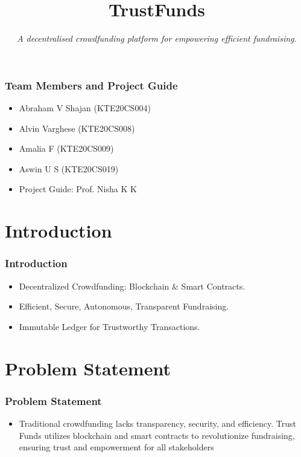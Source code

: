 \documentclass{beamer}
\title[SkillVine]{\textbf{TrustFunds}}
\subtitle{\textit{A decentralised crowdfunding platform for empowering efficient fundraising.}}
\date{}
\begin{document}
{
\begin{frame}[plain]
  \vspace{60pt}
  \centering
  \maketitle
\end{frame}
}

{
\begin{frame}
  \frametitle{Team Members and Project Guide}
  \begin{itemize}
    \item Abraham V Shajan (KTE20CS004)
    \item Alvin Varghese (KTE20CS008)
    \item Amalia F (KTE20CS009)
    \item Aswin U S (KTE20CS019)
    \vspace{10pt}
    \item Project Guide: Prof. Nisha K K
  \end{itemize}
\end{frame}
}


\section{Introduction}
\begin{frame}
  \frametitle{Introduction}
  \begin{itemize}
    \item Decentralized Crowdfunding: Blockchain \& Smart Contracts.
    \vspace{10pt}
    \item Efficient, Secure, Autonomous, Transparent Fundraising.
    \vspace{10pt}
    \item Immutable Ledger for Trustworthy Transactions.
    \vspace{10pt}
  \end{itemize}
\end{frame}


\section{Problem Statement}
\begin{frame}
  \frametitle{Problem Statement}
  \begin{itemize}
    \item Traditional crowdfunding lacks transparency, security, and efficiency. Trust Funds utilizes blockchain and smart contracts to revolutionize fundraising, ensuring trust and empowerment for all stakeholders
  \end{itemize}
\end{frame}
\end{document}
